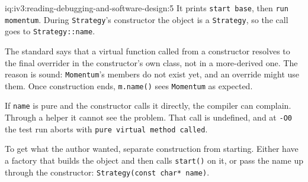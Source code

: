 \begin{solution}{iq:iv3:reading-debugging-and-software-design:5}
It prints \texttt{start base}, then \texttt{run momentum}. During \texttt{Strategy}'s constructor the object is a \texttt{Strategy}, so the call goes to \texttt{Strategy::name}.

The standard says that a virtual function called from a constructor resolves to the final overrider in the constructor's own class, not in a more-derived one. The reason is sound: \texttt{Momentum}'s members do not exist yet, and an override might use them. Once construction ends, \texttt{m.name()} sees \texttt{Momentum} as expected.

If \texttt{name} is pure and the constructor calls it directly, the compiler can complain. Through a helper it cannot see the problem. That call is undefined, and at \texttt{-O0} the test run aborts with \texttt{pure virtual method called}.

To get what the author wanted, separate construction from starting. Either have a factory that builds the object and then calls \texttt{start()} on it, or pass the name up through the constructor: \texttt{Strategy(const char* name)}.


\end{solution}

